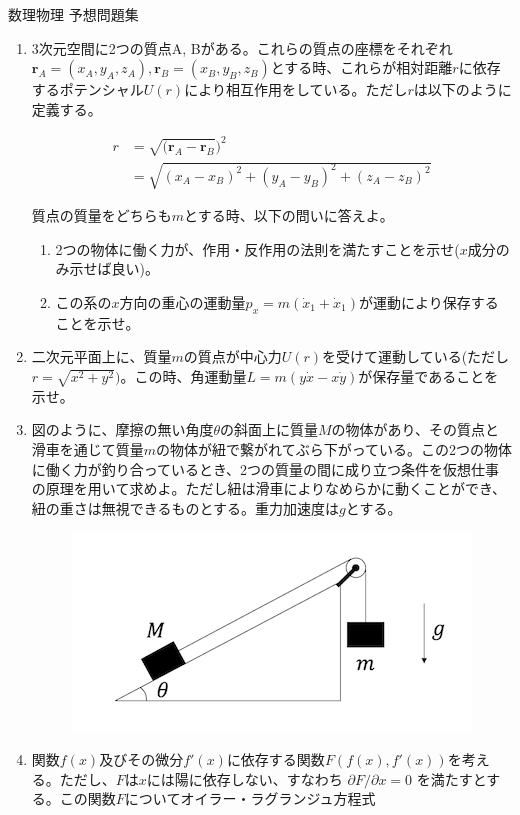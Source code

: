 \documentclass{jsarticle}
\begin{document}
\begin{center}
    {\huge 数理物理 予想問題集}\\
\end{center}

\begin{enumerate}
    \item 3次元空間に2つの質点A, Bがある。これらの質点の座標をそれぞれ$\bm{r}_A = (x_A,y_A,z_A), \bm{r}_B = (x_B,y_B,z_B)$とする時、これらが相対距離$r$に依存するポテンシャル$U(r)$により相互作用をしている。ただし$r$は以下のように定義する。

          $$
              \begin{aligned}
                  r & = \sqrt{(\boldsymbol{r}_A -\boldsymbol{r}_B})^2 \\
                    & = \sqrt{(x_A-x_B)^2+(y_A-y_B)^2+(z_A-z_B)^2}
              \end{aligned}
          $$

          質点の質量をどちらも$m$とする時、以下の問いに答えよ。

          \begin{enumerate}
              \item 2つの物体に働く力が、作用・反作用の法則を満たすことを示せ($x$成分のみ示せば良い)。
              \item この系の$x$方向の重心の運動量$p_x = m(\dot{x}_1 + \dot{x}_1)$が運動により保存することを示せ。

          \end{enumerate}

    \item 二次元平面上に、質量$m$の質点が中心力$U(r)$を受けて運動している(ただし$r=\sqrt{x^2+y^2})$。この時、角運動量$L=m(y\dot{x} - x\dot{y})$が保存量であることを示せ。
    \item 図のように、摩擦の無い角度$\theta$の斜面上に質量$M$の物体があり、その質点と滑車を通じて質量$m$の物体が紐で繋がれてぶら下がっている。この2つの物体に働く力が釣り合っているとき、2つの質量の間に成り立つ条件を仮想仕事の原理を用いて求めよ。ただし紐は滑車によりなめらかに動くことができ、紐の重さは無視できるものとする。重力加速度は$g$とする。
          \begin{figure}[H]
              \centering
              \includegraphics{fig/slope.png}
          \end{figure}
    \item 関数$f(x)$及びその微分$f'(x)$に依存する関数$F(f(x), f'(x))$を考える。ただし、$F$は$x$には陽に依存しない、すなわち $\partial F/\partial x = 0$ を満たすとする。この関数$F$についてオイラー・ラグランジュ方程式


\end{enumerate}
\end{document}
